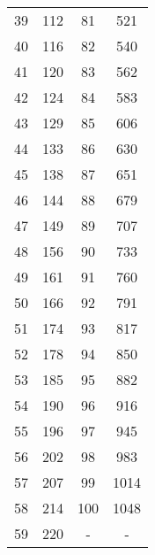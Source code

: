 \begin{table}[H]
\begin{tabular}{S S S S}
            39          &112            & 81          &521     \\
            40          &116            & 82          &540     \\
            41          &120            & 83          &562     \\
            42          &124            & 84          &583     \\
            43          &129            & 85          &606     \\
            44          &133            & 86          &630     \\
            45          &138            & 87          &651     \\
            46          &144            & 88          &679     \\
            47          &149            & 89          &707     \\
            48          &156            & 90          &733     \\
            49          &161            & 91          &760     \\
            50          &166            & 92          &791     \\
            51          &174            & 93          &817     \\
            52          &178            & 94          &850     \\
            53          &185            & 95          &882     \\
            54          &190            & 96          &916     \\
            55          &196            & 97          &945     \\
            56          &202            & 98          &983     \\
            57          &207            & 99          &1014    \\
            58          &214            & 100         &1048    \\
            59          &220            & {-}           &{-}       \\
      \bottomrule
    \end{tabular}
  \end{table}